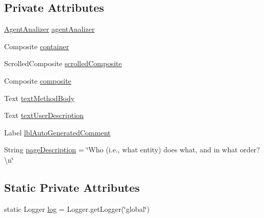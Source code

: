 \subsection*{Private Attributes}
\begin{DoxyCompactItemize}
\item 
\hyperlink{classit_1_1isislab_1_1masonhelperdocumentation_1_1analizer_1_1_agent_analizer}{Agent\-Analizer} \hyperlink{classit_1_1isislab_1_1masonhelperdocumentation_1_1mason_1_1wizards_1_1_l___step_method_page_a0e0b633d8d346100b6ab65b05d9d60e6}{agent\-Analizer}
\item 
Composite \hyperlink{classit_1_1isislab_1_1masonhelperdocumentation_1_1mason_1_1wizards_1_1_l___step_method_page_af82020d1675719f61ee42e85d7fb9d83}{container}
\item 
Scrolled\-Composite \hyperlink{classit_1_1isislab_1_1masonhelperdocumentation_1_1mason_1_1wizards_1_1_l___step_method_page_adf242c4fc6634f961d3c311e4d2d6e25}{scrolled\-Composite}
\item 
Composite \hyperlink{classit_1_1isislab_1_1masonhelperdocumentation_1_1mason_1_1wizards_1_1_l___step_method_page_a73ff4ee05e8c5b36aed06fa604e32ac2}{composite}
\item 
Text \hyperlink{classit_1_1isislab_1_1masonhelperdocumentation_1_1mason_1_1wizards_1_1_l___step_method_page_a8dc8dfbedd4fadf1c63f825645893362}{text\-Method\-Body}
\item 
Text \hyperlink{classit_1_1isislab_1_1masonhelperdocumentation_1_1mason_1_1wizards_1_1_l___step_method_page_a7cb65b64022898b986f913f4a7ae43d3}{text\-User\-Description}
\item 
Label \hyperlink{classit_1_1isislab_1_1masonhelperdocumentation_1_1mason_1_1wizards_1_1_l___step_method_page_af9b2ba2f488b5e92c1e8745127d3162c}{lbl\-Auto\-Generated\-Comment}
\item 
String \hyperlink{classit_1_1isislab_1_1masonhelperdocumentation_1_1mason_1_1wizards_1_1_l___step_method_page_af012bc571abe3f056d64d449be7a9451}{page\-Description} = \char`\"{}Who (i.\-e., what entity) does what, and in what order?\textbackslash{}n\char`\"{}
\end{DoxyCompactItemize}
\subsection*{Static Private Attributes}
\begin{DoxyCompactItemize}
\item 
static Logger \hyperlink{classit_1_1isislab_1_1masonhelperdocumentation_1_1mason_1_1wizards_1_1_l___step_method_page_a8f2982e9c036fc3a2b43a26d5b9b0911}{log} = Logger.\-get\-Logger(\char`\"{}global\char`\"{})
\end{DoxyCompactItemize}


